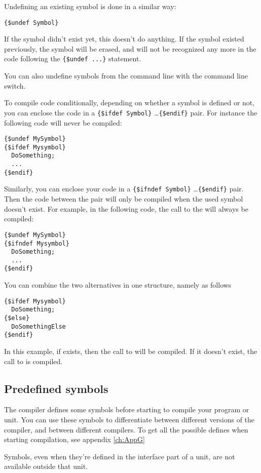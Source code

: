 Undefining an existing symbol is done in a similar way:
\begin{verbatim}
{$undef Symbol}
\end{verbatim}
If the symbol didn't exist yet, this doesn't do anything. If the symbol
existed previously, the symbol will be erased, and will not be recognized
any more in the code following the \verb|{$undef ...}| statement.

You can also undefine symbols from the command line with the 
command line switch.

To compile code conditionally, depending on whether a symbol is defined or
not, you can enclose the code in a \verb|{$ifdef Symbol}| \dots \verb|{$endif}|
pair. For instance the following code will never be compiled:
\begin{verbatim}
{$undef MySymbol}
{$ifdef Mysymbol}
  DoSomething;
  ...
{$endif}
\end{verbatim}

Similarly, you can enclose your code in a \verb|{$ifndef Symbol}| \dots \verb|{$endif}|
pair. Then the code between the pair will only be compiled when the used
symbol doesn't exist. For example, in the following code, the call to the
 will always be compiled:
\begin{verbatim}
{$undef MySymbol}
{$ifndef Mysymbol}
  DoSomething;
  ...
{$endif}
\end{verbatim}

You can combine the two alternatives in one structure, namely as follows
\begin{verbatim}
{$ifdef Mysymbol}
  DoSomething;
{$else}
  DoSomethingElse
{$endif}
\end{verbatim}
In this example, if  exists, then the call to 
will be compiled. If it doesn't exist, the call to  is
compiled.

\subsection{Predefined symbols}

The \fpc compiler defines some symbols before starting to compile your
program or unit. You can use these symbols to differentiate between
different versions of the compiler, and between different compilers.
To get all the possible defines when starting compilation,
see appendix \ref{ch:AppG}

\begin{remark}Symbols, even when they're defined in the interface part of
a unit, are not available outside that unit.
\end{remark}

